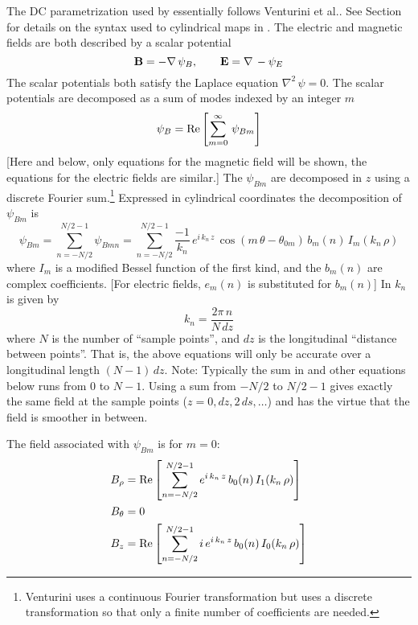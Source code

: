 The DC  parametrization used by \bmad essentially follows Venturini et
al.\cite{b:vent.map}. See Section~ for details on the syntax used to cylindrical
maps in \bmad. The electric and magnetic fields are both described by a scalar potential
\begin{equation}
  {\bf B} = -\nabla \, \psi_B, \qquad {\bf E} = \nabla \, -\psi_E
\end{equation}
The scalar potentials both satisfy the Laplace equation $\nabla^2 \, \psi = 0$.
The scalar potentials are decomposed as a sum of modes indexed by an integer $m$
\begin{equation}
  \psi_B = \operatorname{Re} \left[ \sum_{m = 0}^\infty \, \psi_{Bm} \right]
\end{equation}
[Here and below, only equations for the magnetic field will be shown, the equations for the electric
fields are similar.] The $\psi_{Bm}$ are decomposed in $z$ using a discrete Fourier
sum.\footnote{Venturini uses a continuous Fourier transformation but \bmad uses a discrete
transformation so that only a finite number of coefficients are needed.}
Expressed in cylindrical coordinates the decomposition of $\psi_{Bm}$ is
\begin{equation}
  \psi_{Bm} = \sum_{n=-N/2}^{N/2-1} \psi_{Bmn} =
  \sum_{n=-N/2}^{N/2-1} \frac{-1}{k_n} \, e^{i \, k_n \, z} \,
  \cos (m \, \theta - \theta_{0m}) \, b_m(n) \, I_m(k_n \, \rho)
  \label{psps1k}
\end{equation}
where $I_m$ is a modified Bessel function of the first kind, and the
$b_m(n)$ are complex coefficients. [For electric fields, $e_m(n)$ is
substituted for $b_m(n)$] In  $k_n$ is
given by
\begin{equation}
  k_n = \frac{2 \pi \, n}{N \, dz}
\end{equation}
where $N$ is the number of ``sample points'', and $dz$ is the longitudinal ``distance between
points''. That is, the above equations will only be accurate over a longitudinal length $(N-1)
\, dz$. Note: Typically the sum in  and other equations below runs from $0$ to $N-1$.
Using a sum from $-N/2$ to $N/2-1$ gives exactly the same field at the sample points ($z = 0, dz,
2\,ds, \ldots$) and has the virtue that the field is smoother in between.

The field associated with $\psi_{Bm}$ is for $m = 0$:
\begin{align}
  B_\rho &= \operatorname{Re} \left[ 
    \sum_{n=-N/2}^{N/2-1} e^{i \, k_n \, z} \, b_0(n) \,
    I_1(k_n \, \rho) \right] \nonumber \\
  B_\theta &= 0 \\
  B_z &= \operatorname{Re} \left[ 
    \sum_{n=-N/2}^{N/2-1} i \, e^{i \, k_n \, z} \, b_0(n) \,
    I_0(k_n \, \rho) \right]
    \nonumber
\end{align}

